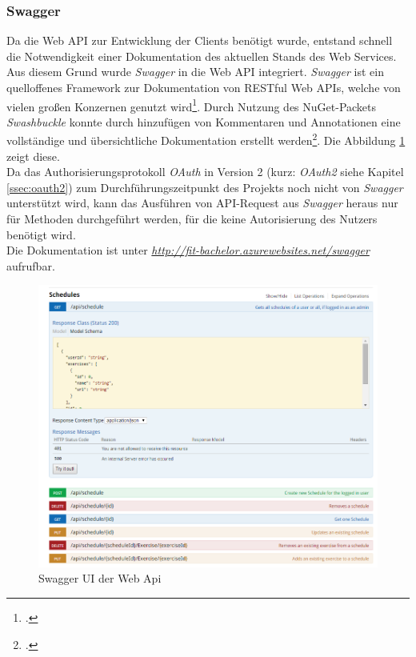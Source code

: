 \subsubsection*{Swagger}
\label{sssec:Swagger}
Da die Web \ac{API} zur Entwicklung der Clients benötigt wurde, entstand schnell die Notwendigkeit einer Dokumentation des aktuellen Stands des Web Services. \\
Aus diesem Grund wurde \textit{Swagger} in die Web \ac{API} integriert. \textit{Swagger} ist ein quelloffenes Framework zur Dokumentation von \ac{REST}ful Web \ac{API}s, welche von vielen großen Konzernen genutzt wird\footcite{swagger}. Durch Nutzung des \gls{NuGet}-Packets \textit{Swashbuckle} konnte durch hinzufügen von Kommentaren und Annotationen eine vollständige und übersichtliche Dokumentation erstellt werden\footcite{implementing-Swagger}. Die Abbildung \ref{pic:swagger-UI} zeigt diese. \\
Da das Authorisierungsprotokoll \textit{OAuth} in Version 2 (kurz: \textit{OAuth2} siehe Kapitel \ref{ssec:oauth2}) zum Durchführungszeitpunkt des Projekts noch nicht von \textit{Swagger} unterstützt wird, kann das Ausführen von API-Request aus \textit{Swagger} heraus nur für Methoden durchgeführt werden, für die keine Autorisierung des Nutzers benötigt wird. \\
Die Dokumentation ist unter \textit{\href{http://fit-bachelor.azurewebsites.net/swagger}{http://fit-bachelor.azurewebsites.net/swagger}} aufrufbar. 
\begin{figure}[!h]
\centering
\includegraphics[width=0.8\linewidth]{content/images/Swagger-UI-fIT}
\caption{Swagger UI der Web Api}
\label{pic:swagger-UI}
\end{figure}

